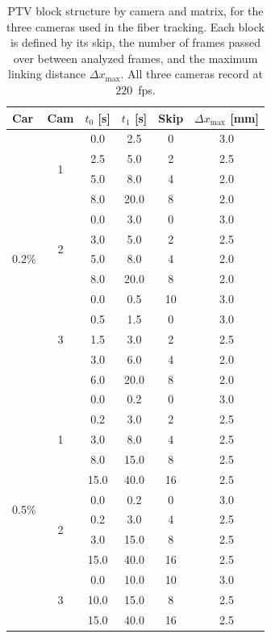 \documentclass[%
  aip,
  pof,
  reprint,
  floatfix
]{revtex4-2}
\begin{document}
\begin{table}[htb]
\centering
\caption{PTV block structure by camera and matrix, for the three cameras used in the fiber tracking. Each block is defined by its skip, the number of frames passed over between analyzed frames, and the maximum linking distance $\Delta x_{\max}$. All three cameras record at $220$~fps.}
\label{tab:sup_ptv_blocks}
\begin{tabular}{l c c c c c}
\toprule
\textbf{Car} & \textbf{Cam} & $t_0$ [s] & $t_1$ [s] & \textbf{Skip} & $\Delta x_{\max}$ [mm] \\
\midrule
\multirow{13}{*}{0.2\%}
 & \multirow{4}{*}{1} & 0.0 &  2.5 & 0 & 3.0 \\
 &                    & 2.5 &  5.0 & 2 & 2.5 \\
 &                    & 5.0 &  8.0 & 4 & 2.0 \\
 &                    & 8.0 & 20.0 & 8 & 2.0 \\
\cmidrule(lr){2-6}
 & \multirow{4}{*}{2} & 0.0 &  3.0 & 0 & 3.0 \\
 &                    & 3.0 &  5.0 & 2 & 2.5 \\
 &                    & 5.0 &  8.0 & 4 & 2.0 \\
 &                    & 8.0 & 20.0 & 8 & 2.0 \\
\cmidrule(lr){2-6}
 & \multirow{5}{*}{3} & 0.0 &  0.5 & 10 & 3.0 \\
 &                    & 0.5 &  1.5 &  0 & 3.0 \\
 &                    & 1.5 &  3.0 &  2 & 2.5 \\
 &                    & 3.0 &  6.0 &  4 & 2.0 \\
 &                    & 6.0 & 20.0 &  8 & 2.0 \\
\midrule
\multirow{12}{*}{0.5\%}
 & \multirow{5}{*}{1} &  0.0 &  0.2 &  0 & 3.0 \\
 &                    &  0.2 &  3.0 &  2 & 2.5 \\
 &                    &  3.0 &  8.0 &  4 & 2.5 \\
 &                    &  8.0 & 15.0 &  8 & 2.5 \\
 &                    & 15.0 & 40.0 & 16 & 2.5 \\
\cmidrule(lr){2-6}
 & \multirow{4}{*}{2} &  0.0 &  0.2 &  0 & 3.0 \\
 &                    &  0.2 &  3.0 &  4 & 2.5 \\
 &                    &  3.0 & 15.0 &  8 & 2.5 \\
 &                    & 15.0 & 40.0 & 16 & 2.5 \\
\cmidrule(lr){2-6}
 & \multirow{3}{*}{3} &  0.0 & 10.0 & 10 & 3.0 \\
 &                    & 10.0 & 15.0 &  8 & 2.5 \\
 &                    & 15.0 & 40.0 & 16 & 2.5 \\
\bottomrule
\end{tabular}
\end{table}
\end{document}
